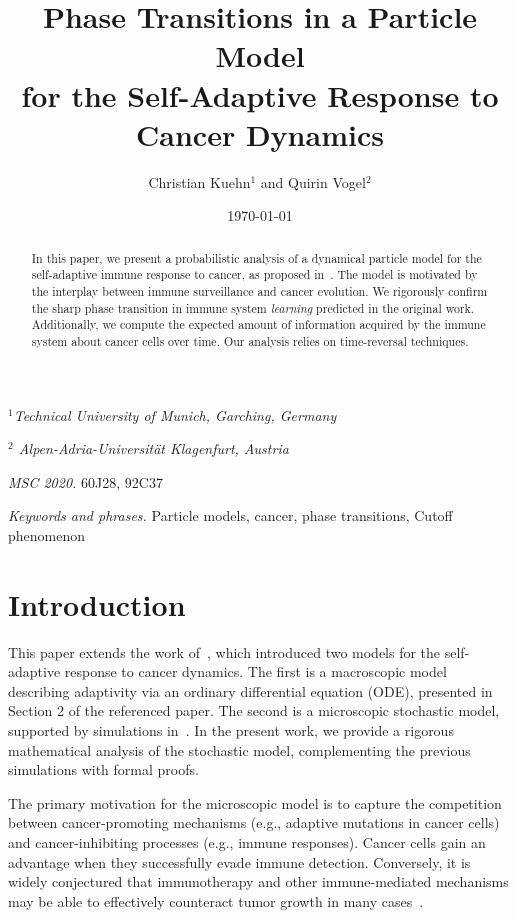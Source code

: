 \documentclass{article}
\title{Phase Transitions in a Particle Model\\ for the Self-Adaptive Response to Cancer Dynamics}
\author{Christian Kuehn$^{1}$ and Quirin Vogel$^{2}$}
\date{\today}
\numberwithin{equation}{section}
\newcommand{\1}{\mathbbm{1}}
\begin{document}
\maketitle

\begin{abstract}
    In this paper, we present a probabilistic analysis of a dynamical particle model for the self-adaptive immune response to cancer, as proposed in~\cite{kuehn2025mathematicalmodelsselfadaptiveresponse}. The model is motivated by the interplay between immune surveillance and cancer evolution. We rigorously confirm the sharp phase transition in immune system \textit{learning} predicted in the original work. Additionally, we compute the expected amount of information acquired by the immune system about cancer cells over time. Our analysis relies on time-reversal techniques.
\end{abstract}
\centerline{\textit{$^1$Technical University of Munich, Garching, Germany}}
\centerline{\textit{$^2$
Alpen-Adria-Universität Klagenfurt, Austria}}
\bigskip




\bigskip\noindent 
{\it MSC 2020.} 60J28, 92C37

\medskip\noindent
{\it Keywords and phrases.} Particle models, cancer, phase transitions, Cutoff phenomenon
\section{Introduction}
This paper extends the work of~\cite{kuehn2025mathematicalmodelsselfadaptiveresponse}, which introduced two models for the self-adaptive response to cancer dynamics. The first is a macroscopic model describing adaptivity via an ordinary differential equation (ODE), presented in Section 2 of the referenced paper. The second is a microscopic stochastic model, supported by simulations in~\cite[Section 3]{kuehn2025mathematicalmodelsselfadaptiveresponse}. In the present work, we provide a rigorous mathematical analysis of the stochastic model, complementing the previous simulations with formal proofs.

The primary motivation for the microscopic model is to capture the competition between cancer-promoting mechanisms (e.g., adaptive mutations in cancer cells) and cancer-inhibiting processes (e.g., immune responses). Cancer cells gain an advantage when they successfully evade immune detection. Conversely, it is widely conjectured that immunotherapy and other immune-mediated mechanisms may be able to effectively counteract tumor growth in many cases~\cite{baxevanis2023thin,khanmammadova2023neuro}.
\end{document}
